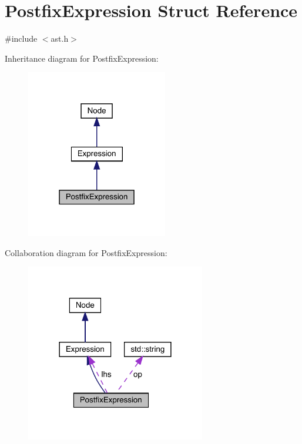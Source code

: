\hypertarget{struct_postfix_expression}{}\section{Postfix\+Expression Struct Reference}
\label{struct_postfix_expression}


{\ttfamily \#include $<$ast.\+h$>$}



Inheritance diagram for Postfix\+Expression\+:
\nopagebreak
\begin{figure}[H]
\begin{center}
\leavevmode
\includegraphics[width=175pt]{struct_postfix_expression__inherit__graph}
\end{center}
\end{figure}


Collaboration diagram for Postfix\+Expression\+:
\nopagebreak
\begin{figure}[H]
\begin{center}
\leavevmode
\includegraphics[width=222pt]{struct_postfix_expression__coll__graph}
\end{center}
\end{figure}
